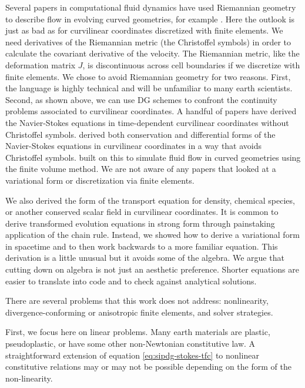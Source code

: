 \documentclass[gmd, manuscript]{copernicus}
\begin{document}
Several papers in computational fluid dynamics have used Riemannian geometry to describe flow in evolving curved geometries, for example \citet{luo2004contravariant}.
Here the outlook is just as bad as for curvilinear coordinates discretized with finite elements.
We need derivatives of the Riemannian metric (the Christoffel symbols) in order to calculate the covariant derivative of the velocity.
The Riemannian metric, like the deformation matrix $J$, is discontinuous across cell boundaries if we discretize with finite elements.
We chose to avoid Riemannian geometry for two reasons.
First, the language is highly technical and will be unfamiliar to many earth scientists.
Second, as shown above, we can use DG schemes to confront the continuity problems associated to curvilinear coordinates.
A handful of papers have derived the Navier-Stokes equations in time-dependent curvilinear coordinates without Christoffel symbols.
\citet{warsi1981conservation} derived both conservation and differential forms of the Navier-Stokes equations in curvilinear coordinates in a way that avoids Christoffel symbols.
\citet{yang1994general} built on this to simulate fluid flow in curved geometries using the finite volume method.
We are not aware of any papers that looked at a variational form or discretization via finite elements.

We also derived the form of the transport equation for density, chemical species, or another conserved scalar field in curvilinear coordinates.
It is common to derive transformed evolution equations in strong form through painstaking application of the chain rule.
Instead, we showed how to derive a variational form in spacetime and to then work backwards to a more familiar equation.
This derivation is a little unusual but it avoids some of the algebra.
We argue that cutting down on algebra is not just an aesthetic preference.
Shorter equations are easier to translate into code and to check against analytical solutions.

There are several problems that this work does not address: nonlinearity, divergence-conforming or anisotropic finite elements, and solver strategies.

First, we focus here on linear problems.
Many earth materials are plastic, pseudoplastic, or have some other non-Newtonian constitutive law.
A straightforward extension of equation \eqref{eq:sipdg-stokes-tfc} to nonlinear constitutive relations may or may not be possible depending on the form of the non-linearity.
\end{document}
